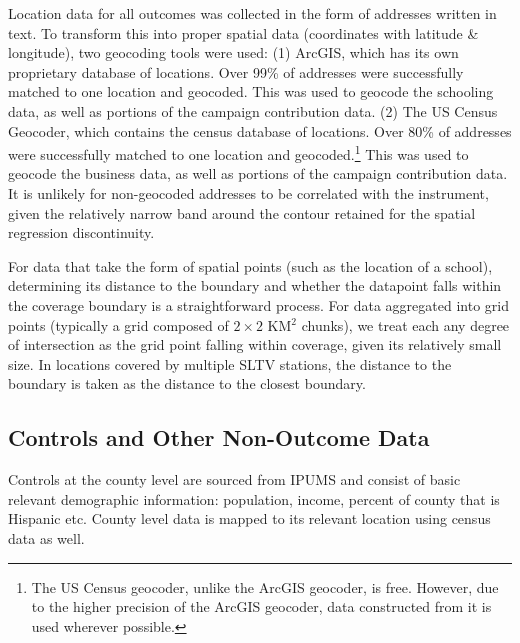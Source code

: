 \documentclass[11pt]{article}
\begin{document}
Location data for all outcomes was collected in the form of addresses written in text. To transform this into proper spatial data (coordinates with latitude \& longitude), two geocoding tools were used: (1) ArcGIS, which has its own proprietary database of locations. Over 99\% of addresses were successfully matched to one location and geocoded. This was used to geocode the schooling data, as well as portions of the campaign contribution data. (2) The US Census Geocoder, which contains the census database of locations. Over 80\% of addresses were successfully matched to one location and geocoded.\footnote{The US Census geocoder, unlike the ArcGIS geocoder, is free. However, due to the higher precision of the ArcGIS geocoder, data constructed from it is used wherever possible. } This was used to geocode the business data, as well as portions of the campaign contribution data. It is unlikely for non-geocoded addresses to be correlated with the instrument, given the relatively narrow band around the contour retained for the spatial regression discontinuity.

For data that take the form of spatial points (such as the location of a school), determining its distance to the boundary and whether the datapoint falls within the coverage boundary is a straightforward process.  For data aggregated into grid points (typically a grid composed of $2 \times 2$ KM$^2$ chunks), we treat each any degree of intersection as the grid point falling within coverage, given its relatively small size. In locations covered by multiple SLTV stations, the distance to the boundary is taken as the distance to the closest boundary. %

\subsection{Controls and Other Non-Outcome Data}
Controls at the county level are sourced from IPUMS and consist of basic relevant demographic information: population, income, percent of county that is Hispanic etc. County level data is mapped to its relevant location using census data as well. 
\end{document}
